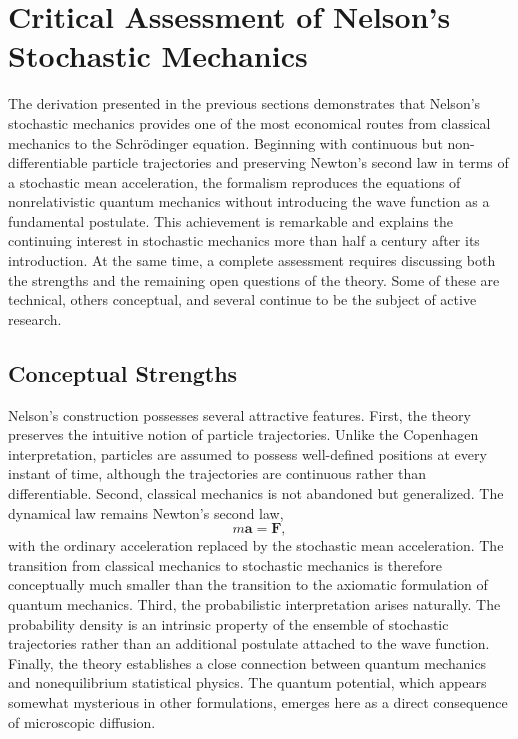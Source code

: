 \section{Critical Assessment of Nelson's Stochastic Mechanics}
\label{sec:CriticalNelson}
The derivation presented in the previous sections demonstrates that
Nelson's stochastic mechanics provides one of the most economical routes
from classical mechanics to the Schrödinger equation. Beginning with
continuous but non-differentiable particle trajectories and preserving
Newton's second law in terms of a stochastic mean acceleration, the
formalism reproduces the equations of nonrelativistic quantum
mechanics without introducing the wave function as a fundamental
postulate.
This achievement is remarkable and explains the continuing interest in
stochastic mechanics more than half a century after its introduction.
At the same time, a complete assessment requires discussing both the
strengths and the remaining open questions of the theory. Some of these
are technical, others conceptual, and several continue to be the subject
of active research.
\subsection{Conceptual Strengths}
Nelson's construction possesses several attractive features.
First, the theory preserves the intuitive notion of particle
trajectories. Unlike the Copenhagen interpretation, particles are
assumed to possess well-defined positions at every instant of time,
although the trajectories are continuous rather than differentiable.
Second, classical mechanics is not abandoned but generalized.
The dynamical law remains Newton's second law,
\[m\mathbf a=\mathbf F,\]
with the ordinary acceleration replaced by the stochastic mean
acceleration. The transition from classical mechanics to stochastic
mechanics is therefore conceptually much smaller than the transition to
the axiomatic formulation of quantum mechanics.
Third, the probabilistic interpretation arises naturally.
The probability density is an intrinsic property of the ensemble of
stochastic trajectories rather than an additional postulate attached to
the wave function.
Finally, the theory establishes a close connection between quantum
mechanics and nonequilibrium statistical physics. The quantum potential,
which appears somewhat mysterious in other formulations, emerges here as
a direct consequence of microscopic diffusion.
